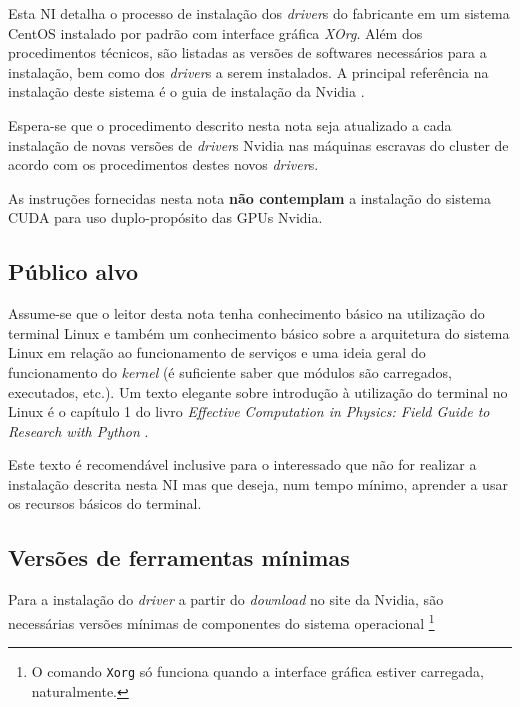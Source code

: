 \documentclass[twoside,a4paper,12pt,english]{inac17}
\begin{document}
Esta NI detalha o processo de instalação dos \textit{driver}s do fabricante 
em um sistema CentOS instalado por padrão com interface gráfica \textit{XOrg}. 
Além dos procedimentos técnicos, são listadas as versões de softwares 
necessários para a instalação, bem como dos \textit{driver}s a serem instalados. A principal referência na instalação deste sistema 
é o guia de instalação da Nvidia \cite{inst-nvidia}.

Espera-se que o procedimento descrito nesta nota seja atualizado 
a cada instalação de novas versões de \textit{driver}s Nvidia nas máquinas 
escravas do cluster de acordo com os procedimentos destes novos 
\textit{driver}s.

As instruções fornecidas nesta nota \textbf{não contemplam} a 
instalação do sistema CUDA para uso duplo-propósito das GPUs 
Nvidia.

\subsection{Público alvo}

Assume-se que o leitor desta nota tenha conhecimento básico na utilização do 
terminal Linux e também um conhecimento básico sobre a arquitetura do sistema 
Linux em relação ao funcionamento de serviços e uma ideia geral do funcionamento 
do \textit{kernel} (é suficiente saber que módulos são carregados, executados, etc.).
Um texto elegante sobre introdução à utilização do terminal no Linux é o capítulo 
1 do livro \textit{Effective Computation in Physics: Field Guide to Research with Python} \cite{Scopatz2015}.

Este texto é recomendável inclusive para o interessado que não for realizar a instalação descrita nesta NI mas que deseja, num tempo mínimo, aprender a usar 
os recursos básicos do terminal.

\subsection{Versões de ferramentas mínimas}

Para a instalação do \textit{driver} a partir do \textit{download} 
no site da Nvidia, são necessárias versões mínimas de componentes 
do sistema operacional \footnote{O comando \texttt{Xorg} só funciona 
quando a interface gráfica estiver carregada, naturalmente.} 
\end{document}
